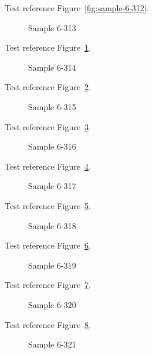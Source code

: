 Test reference Figure~\ref{fig:sample-6-312}.

\begin{figure}[tbhp]
\caption{Sample 6-313}
\label{fig:sample-6-313}
\end{figure}

Test reference Figure~\ref{fig:sample-6-313}.

\begin{figure}[tbhp]
\caption{Sample 6-314}
\label{fig:sample-6-314}
\end{figure}

Test reference Figure~\ref{fig:sample-6-314}.

\begin{figure}[tbhp]
\caption{Sample 6-315}
\label{fig:sample-6-315}
\end{figure}

Test reference Figure~\ref{fig:sample-6-315}.

\begin{figure}[tbhp]
\caption{Sample 6-316}
\label{fig:sample-6-316}
\end{figure}

Test reference Figure~\ref{fig:sample-6-316}.

\begin{figure}[tbhp]
\caption{Sample 6-317}
\label{fig:sample-6-317}
\end{figure}

Test reference Figure~\ref{fig:sample-6-317}.

\begin{figure}[tbhp]
\caption{Sample 6-318}
\label{fig:sample-6-318}
\end{figure}

Test reference Figure~\ref{fig:sample-6-318}.

\begin{figure}[tbhp]
\caption{Sample 6-319}
\label{fig:sample-6-319}
\end{figure}

Test reference Figure~\ref{fig:sample-6-319}.

\begin{figure}[tbhp]
\caption{Sample 6-320}
\label{fig:sample-6-320}
\end{figure}

Test reference Figure~\ref{fig:sample-6-320}.

\begin{figure}[tbhp]
\caption{Sample 6-321}
\label{fig:sample-6-321}
\end{figure}

